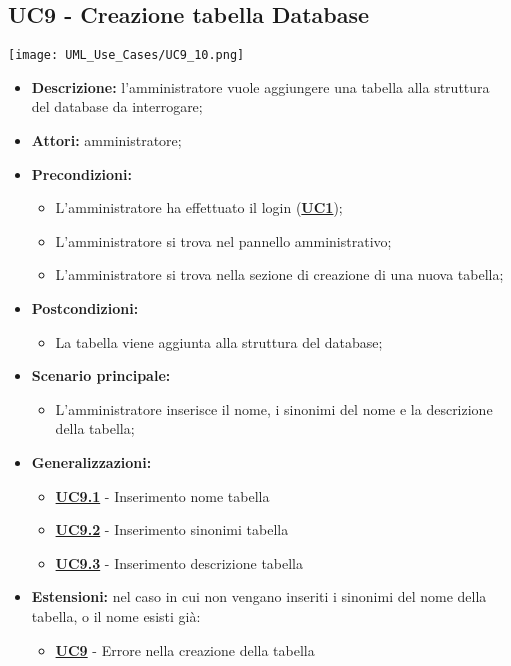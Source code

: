 \subsection{UC9 - Creazione tabella Database}
\label{sec:UC9}
\texttt{[image: UML\_Use\_Cases/UC9\_10.png]}
\begin{itemize}
	\item \textbf{Descrizione:} l’amministratore vuole aggiungere una tabella alla struttura del database da interrogare;
	\item \textbf{Attori:} amministratore;
	\item \textbf{Precondizioni:} 
	\begin{itemize}
		\item L’amministratore ha effettuato il login (\hyperref[sec:UC1]{\textbf{UC1}});
		\item L’amministratore si trova nel pannello amministrativo;
		\item L’amministratore si trova nella sezione di creazione di una nuova tabella;
	\end{itemize}
	\item \textbf{Postcondizioni:} 
	\begin{itemize}
		\item La tabella viene aggiunta alla struttura del database;
	\end{itemize}
	\item \textbf{Scenario principale:} 
	\begin{itemize}
		\item L’amministratore inserisce il nome, i sinonimi del nome e la descrizione della tabella;
	\end{itemize}
	\item \textbf{Generalizzazioni:} 
	\begin{itemize}
		\item \hyperref[sec:UC9.1]{\textbf{UC9.1}} - Inserimento nome tabella
		\item \hyperref[sec:UC9.2]{\textbf{UC9.2}} - Inserimento sinonimi tabella
		\item \hyperref[sec:UC9.3]{\textbf{UC9.3}} - Inserimento descrizione tabella
	\end{itemize}
	\item \textbf{Estensioni:} nel caso in cui non vengano inseriti i sinonimi del nome della tabella, o il nome esisti già:
	\begin{itemize}
		\item \hyperref[sec:UC9]{\textbf{UC9}} - Errore nella creazione della tabella
	\end{itemize}
\end{itemize}


